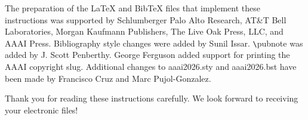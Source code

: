The preparation of the \LaTeX{} and Bib\TeX{} files that implement these instructions was supported by Schlumberger Palo Alto Research, AT\&T Bell Laboratories, Morgan Kaufmann Publishers, The Live Oak Press, LLC, and AAAI Press. Bibliography style changes were added by Sunil Issar. \verb+\+pubnote was added by J. Scott Penberthy. George Ferguson added support for printing the AAAI copyright slug. Additional changes to aaai2026.sty and aaai2026.bst have been made by Francisco Cruz and Marc Pujol-Gonzalez.

\bigskip
\noindent Thank you for reading these instructions carefully. We look forward to receiving your electronic files!
